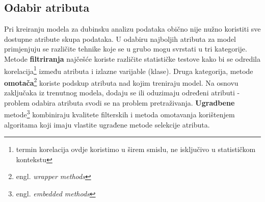 \subsection{Odabir atributa}
Pri kreiranju modela za dubinsku analizu podataka obično nije nužno koristiti sve dostupne atribute skupa podataka. U odabiru najboljih atributa za model primjenjuju se različite tehnike koje se u grubo mogu svrstati u tri kategorije. Metode \textbf{filtriranja} najčešće koriste različite statističke testove kako bi se odredila korelacija\footnote{termin korelacija ovdje koristimo u širem smislu, ne isključivo u statističkom kontekstu} između atributa i izlazne varijable (klase). Druga kategorija, metode \textbf{omotača}\footnote{engl. \textit{wrapper methods}} koriste podskup atributa nad kojim treniraju model. Na osnovu zaključaka iz trenutnog modela, dodaju se ili oduzimaju određeni atributi - problem odabira atributa svodi se na problem pretraživanja. \textbf{Ugradbene} metode\footnote{engl. \textit{embedded methods}} kombiniraju kvalitete filterskih i metoda omotavanja korištenjem algoritama koji imaju vlastite ugrađene metode selekcije atributa.

